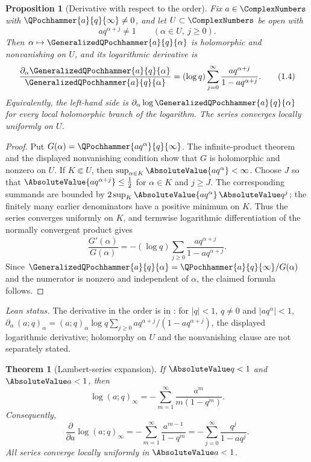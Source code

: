 \documentclass[11pt,a4paper,oneside,openany]{book}
\newtheorem{theorem}{Theorem}[chapter]
\newtheorem{proposition}[proposition]{Proposition}
\theoremstyle{definition}
\theoremstyle{remark}
\begin{document}
\begin{proposition}[Derivative with respect to the order]\label{prop:order-derivative}
Fix $a\in\ComplexNumbers$ with $\QPochhammer{a}{q}{\infty}\ne0$, and let
$U\subset\ComplexNumbers$ be open with
\[
 aq^{\alpha+j}\ne1\qquad(\alpha\in U,\ j\ge0).
\]
Then $\alpha\mapsto\GeneralizedQPochhammer{a}{q}{\alpha}$ is holomorphic and nonvanishing on $U$, and
its logarithmic derivative is
\[
 \frac{\partial_\alpha\GeneralizedQPochhammer{a}{q}{\alpha}}
      {\GeneralizedQPochhammer{a}{q}{\alpha}}
 =(\log q)\sum_{j=0}^{\infty}
 \frac{aq^{\alpha+j}}{1-aq^{\alpha+j}}.
 \tag{1.4}\label{eq:order-derivative}
\]
Equivalently, the left-hand side is
$\partial_\alpha\log\GeneralizedQPochhammer{a}{q}{\alpha}$ for every local holomorphic branch of the
logarithm.  The series converges locally uniformly on $U$.
\end{proposition}

\begin{proof}
Put $G(\alpha)=\QPochhammer{aq^\alpha}{q}{\infty}$.  The infinite-product theorem and the
displayed nonvanishing condition show that $G$ is holomorphic and nonzero on
$U$.  If $K\Subset U$, then
$\sup_{\alpha\in K}\AbsoluteValue{aq^\alpha}<\infty$.  Choose $J$ so that
$\AbsoluteValue{aq^{\alpha+j}}\le\tfrac12$ for $\alpha\in K$ and $j\ge J$.
The corresponding summands are bounded by
$2\sup_K\AbsoluteValue{aq^\alpha}\,\AbsoluteValue q^j$; the finitely many
earlier denominators have a positive minimum on $K$.  Thus the series
converges uniformly on $K$, and termwise logarithmic differentiation of the
normally convergent product gives
\[
 \frac{G'(\alpha)}{G(\alpha)}
 =-(\log q)\sum_{j\ge0}\frac{aq^{\alpha+j}}{1-aq^{\alpha+j}}.
\]
Since $\GeneralizedQPochhammer{a}{q}{\alpha}
=\QPochhammer{a}{q}{\infty}/G(\alpha)$ and the numerator is nonzero and
independent of $\alpha$, the claimed formula follows.
\end{proof}

\emph{Lean status.}  The derivative in the order is
 in :
for $|q|<1$, $q\ne0$ and $|aq^\alpha|<1$,
$\partial_\alpha\,(a;q)_\alpha=(a;q)_\alpha\log q\sum_{j\ge0}aq^{\alpha+j}/(1-aq^{\alpha+j})$,
the displayed logarithmic derivative; holomorphy on $U$ and the nonvanishing clause are
not separately stated.


\begin{theorem}[Lambert-series expansion]\label{thm:lambert-log}
If $\AbsoluteValue q<1$ and $\AbsoluteValue a<1$, then
\[
 \log(a;q)_\infty
 =-\sum_{m=1}^{\infty}\frac{a^m}{m(1-q^m)}.
\]
Consequently,
\[
 \frac{\partial}{\partial a}\log(a;q)_\infty
 =-\sum_{m=1}^{\infty}\frac{a^{m-1}}{1-q^m}
 =-\sum_{j=0}^{\infty}\frac{q^j}{1-aq^j}.
\]
All series converge locally uniformly in $\AbsoluteValue a<1$.
\end{theorem}
\end{document}
